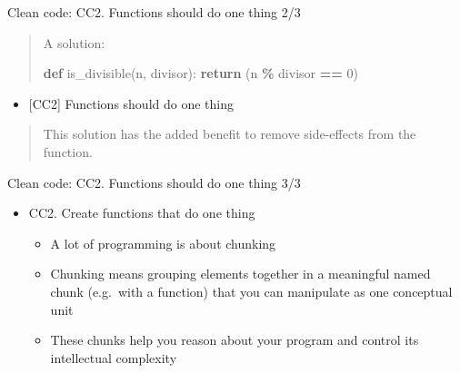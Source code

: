 \documentclass[
  8pt,
  ignorenonframetext,
]{beamer}
\newenvironment{Shaded}{\begin{snugshade}}{\end{snugshade}}
\newcommand{\ControlFlowTok}[1]{\textcolor[rgb]{0.13,0.29,0.53}{\textbf{#1}}}
\newcommand{\DecValTok}[1]{\textcolor[rgb]{0.00,0.00,0.81}{#1}}
\newcommand{\KeywordTok}[1]{\textcolor[rgb]{0.13,0.29,0.53}{\textbf{#1}}}
\newcommand{\NormalTok}[1]{#1}
\newcommand{\OperatorTok}[1]{\textcolor[rgb]{0.81,0.36,0.00}{\textbf{#1}}}
\providecommand{\tightlist}{%
  \setlength{\itemsep}{0pt}\setlength{\parskip}{0pt}}
\begin{document}
\begin{frame}[fragile]{Clean code: CC2. Functions should do one thing
2/3}
\protect\hypertarget{clean-code-cc2.-functions-should-do-one-thing-23}{}
\begin{quote}
A solution:

\begin{Shaded}
\begin{Highlighting}[]
\KeywordTok{def}\NormalTok{ is\_divisible(n, divisor):}
  \ControlFlowTok{return}\NormalTok{ (n }\OperatorTok{\%}\NormalTok{ divisor }\OperatorTok{==} \DecValTok{0}\NormalTok{)}
\end{Highlighting}
\end{Shaded}
\end{quote}

\begin{itemize}[<+->]
\tightlist
\item
  {[}CC2{]} Functions should do one thing
\end{itemize}

\begin{quote}
This solution has the added benefit to remove side-effects from the
function.
\end{quote}
\end{frame}

\begin{frame}{Clean code: CC2. Functions should do one thing 3/3}
\protect\hypertarget{clean-code-cc2.-functions-should-do-one-thing-33}{}
\begin{itemize}
\item
  CC2. Create functions that do one thing

  \begin{itemize}
  \tightlist
  \item
    A lot of programming is about chunking
  \item
    Chunking means grouping elements together in a meaningful named
    chunk (e.g.~with a function) that you can manipulate as one
    conceptual unit
  \item
    These chunks help you reason about your program and control its
    intellectual complexity
  \end{itemize}
\end{itemize}
\end{frame}
\end{document}
